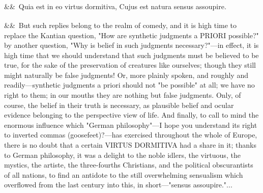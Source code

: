 \documentclass[12pt]{article}
\newcommand{\para}[1][]{\par\noindent\ifx&#1&\else\textsuperscript{\footnotesize #1}~\fi}
\begin{document}
\para Quia est in eo virtus dormitiva, Cujus est natura sensus assoupire.

\para But such replies belong to the realm of comedy, and it is high time to replace the Kantian question, "How are synthetic judgments a PRIORI possible?" by another question, "Why is belief in such judgments necessary?"---in effect, it is high time that we should understand that such judgments must be believed to be true, for the sake of the preservation of creatures like ourselves; though they still might naturally be false judgments! Or, more plainly spoken, and roughly and readily---synthetic judgments a priori should not "be possible" at all; we have no right to them; in our mouths they are nothing but false judgments. Only, of course, the belief in their truth is necessary, as plausible belief and ocular evidence belonging to the perspective view of life. And finally, to call to mind the enormous influence which "German philosophy"---I hope you understand its right to inverted commas (goosefeet)?---has exercised throughout the whole of Europe, there is no doubt that a certain VIRTUS DORMITIVA had a share in it; thanks to German philosophy, it was a delight to the noble idlers, the virtuous, the mystics, the artiste, the three-fourths Christians, and the political obscurantists of all nations, to find an antidote to the still overwhelming sensualism which overflowed from the last century into this, in short---"sensus assoupire."...
\end{document}
